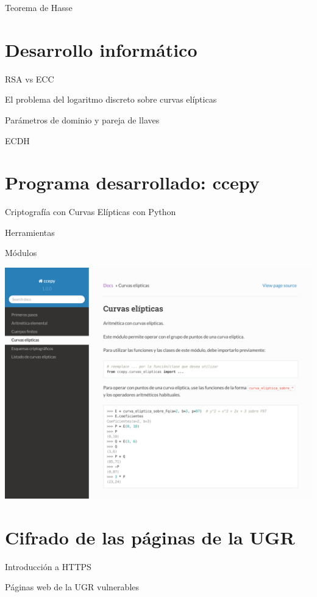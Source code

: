 \documentclass[aspectratio=43,10pt,spanish]{beamer}
\theoremstyle{definition} %
\begin{document}
\begin{frame}{Teorema de Hasse}
\end{frame}


\section{Desarrollo informático}

\begin{frame}{RSA vs ECC}
\end{frame}

\begin{frame}{El problema del logaritmo discreto sobre curvas elípticas}
\end{frame}

\begin{frame}{Parámetros de dominio y pareja de llaves}
\end{frame}

\begin{frame}{ECDH}
\end{frame}


\section{Programa desarrollado: ccepy}

\begin{frame}{Criptografía con Curvas Elípticas con Python}
\end{frame}

\begin{frame}{Herramientas}
\end{frame}

\begin{frame}{Módulos}
\end{frame}

\begin{frame}[plain]
    \hspace*{-11mm}
    \includegraphics[width=\paperwidth]{Graficos/ejemplo_documentacion}
\end{frame}

\section{Cifrado de las páginas de la UGR}

\begin{frame}{Introducción a HTTPS}
\end{frame}

\begin{frame}{Páginas web de la UGR vulnerables}
\end{frame}
\end{document}

